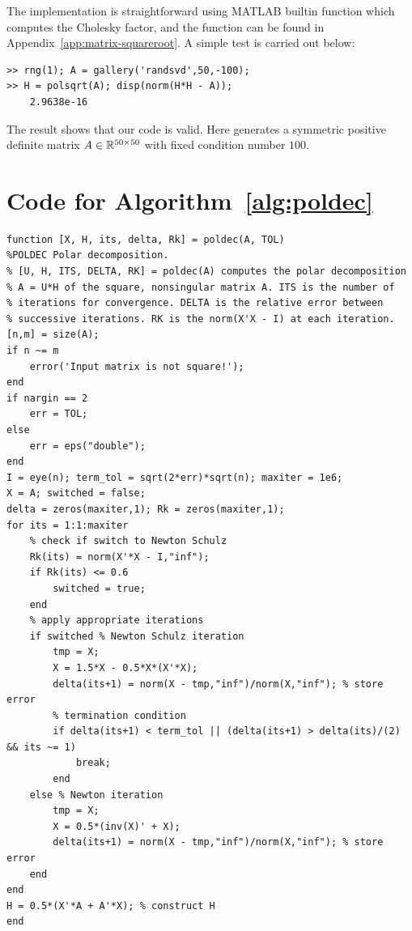 \documentclass[12pt]{article}
\begin{document}
The implementation is straightforward using MATLAB builtin function  which computes the Cholesky factor, and the function  can be found in Appendix~\ref{app:matrix-squareroot}. A simple test is carried out below:
\begin{lstlisting}
>> rng(1); A = gallery('randsvd',50,-100); 
>> H = polsqrt(A); disp(norm(H*H - A));
    2.9638e-16
\end{lstlisting}
The result shows that our code is valid. Here  generates a symmetric positive definite matrix $A\in\mathbb{R}^{50\times 50}$ with fixed condition number $100$.




\newpage 


\newpage 
\appendix
\section{Code for Algorithm~\ref{alg:poldec}} \label{app:poldec.m}
\begin{lstlisting}
function [X, H, its, delta, Rk] = poldec(A, TOL)
%POLDEC Polar decomposition.
% [U, H, ITS, DELTA, RK] = poldec(A) computes the polar decomposition 
% A = U*H of the square, nonsingular matrix A. ITS is the number of
% iterations for convergence. DELTA is the relative error between 
% successive iterations. RK is the norm(X'X - I) at each iteration.
[n,m] = size(A);
if n ~= m
    error('Input matrix is not square!');
end
if nargin == 2
    err = TOL;
else
    err = eps("double");
end
I = eye(n); term_tol = sqrt(2*err)*sqrt(n); maxiter = 1e6;
X = A; switched = false; 
delta = zeros(maxiter,1); Rk = zeros(maxiter,1);
for its = 1:1:maxiter
    % check if switch to Newton Schulz
    Rk(its) = norm(X'*X - I,"inf");
    if Rk(its) <= 0.6
        switched = true;
    end
    % apply appropriate iterations
    if switched % Newton Schulz iteration
        tmp = X;
        X = 1.5*X - 0.5*X*(X'*X);
        delta(its+1) = norm(X - tmp,"inf")/norm(X,"inf"); % store error
        % termination condition
        if delta(its+1) < term_tol || (delta(its+1) > delta(its)/(2) && its ~= 1)
            break;
        end
    else % Newton iteration
        tmp = X;
        X = 0.5*(inv(X)' + X);
        delta(its+1) = norm(X - tmp,"inf")/norm(X,"inf"); % store error
    end
end
H = 0.5*(X'*A + A'*X); % construct H
end
\end{lstlisting}
\newpage 
\end{document}
